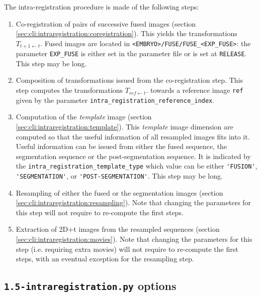 The intra-registration procedure is made of the following steps:
\begin{enumerate}
\itemsep -1ex
\item Co-registration of pairs of successive fused images (section
  \ref{sec:cli:intraregistration:coregistration}). This yields the
  transformations $T_{t+1 \leftarrow t}$. Fused images are located in
  \verb|<EMBRYO>/FUSE/FUSE_<EXP_FUSE>|: the parameter \verb|EXP_FUSE|
  is either set in the parameter file or is set at
  \verb|RELEASE|. This step may be long. 

\item Composition of transformations issued from the co-registration
  step. This step computes the transformations $T_{ref \leftarrow
    t}$. towards a reference image \verb|ref| given by the parameter
  \verb|intra_registration_reference_index|. 

\item Computation of the \textit{template} image (section
  \ref{sec:cli:intraregistration:template}). This \textit{template}
  image dimension are computed so that the useful information of all
  resampled images fits into it. Useful information can be issued from
  either the fused sequence, the segmentation sequence or the
  post-segmentation sequence. It is indicated by the
  \verb|intra_registration_template_type| which value can be either
  \verb|'FUSION'|,  \verb|'SEGMENTATION'|, or
  \verb|'POST-SEGMENTATION'|. This step may be long. 

\item Resampling of either the fused or the segmentation images
  (section \ref{sec:cli:intraregistration:resampling}). Note that
  changing the parameters for this step will not require to re-compute
  the first steps. 

\item Extraction of 2D+t images from the resampled sequences (section
  \ref{sec:cli:intraregistration:movies}). Note that changing the
  parameters for this step (i.e. requiring extra movies) will not
  require to re-compute the first steps, with an eventual exception
  for the resampling step. 

\end{enumerate}



\subsection{\texttt{1.5-intraregistration.py} options}

